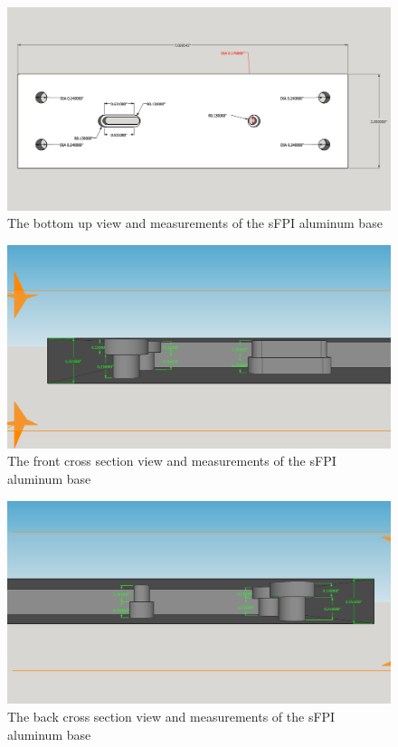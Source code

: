 \documentclass[12pt,journal]{IEEEtran}
\begin{document}
\begin{appendices}
\begin{figure}[h!]
  \centering
	\includegraphics[width=\textwidth]{./mechanical/sfpilensholder_bottom.png}
	\caption[Cavity Mounts]{The bottom up view and measurements of the sFPI aluminum base}
	\label{fig:sfpilensholder-bottom}
\end{figure}  
\newpage

\begin{figure}[h!]
  \centering
	\includegraphics[width=\textwidth]{./mechanical/sfpilensholder_cross_section_1.png}
	\caption[Cavity Mounts]{The front cross section view and measurements of the sFPI aluminum base}
	\label{fig:sfpilensholder-side}
\end{figure} 
\newpage

\begin{figure}[h!]
  \centering
	\includegraphics[width=\textwidth]{./mechanical/sfpilensholder_cross_section_2.png}
	\caption[Cavity Mounts]{The back cross section view and measurements of the sFPI aluminum base}
	\label{fig:sfpilensholder-side}
\end{figure}   


\end{appendices}
\end{document}
